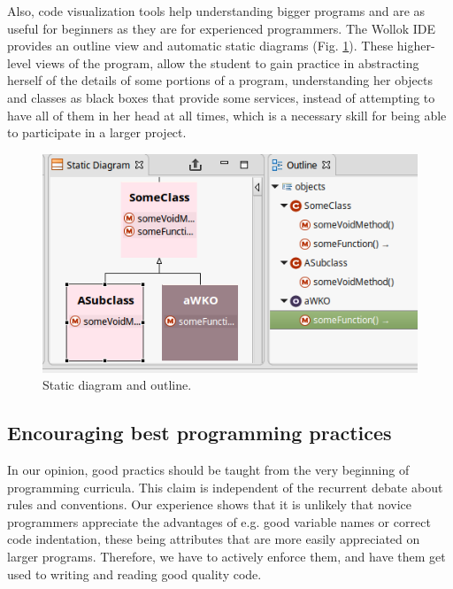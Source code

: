 Also, code visualization tools help understanding bigger programs and are as useful for beginners as they are for experienced programmers.
The Wollok IDE provides an outline view and automatic static diagrams (\cf Fig. \ref{fig:outline}).
These higher-level views of the program, allow the student to gain practice in abstracting herself of the details of some portions of a program, understanding her objects and classes as black boxes that provide some services, instead of attempting to have all of them in her head at all times, which is a necessary skill for being able to participate in a larger project.

\begin{figure}[ht]
 \centering
 \includegraphics[scale=0.5]{images/outline.png}
 \caption{\small Static diagram and outline.}
 \label{fig:outline}
\end{figure}


\subsection{Encouraging best programming practices}
In our opinion, good practics should be taught from the very beginning of programming curricula. This claim is independent of the recurrent debate about rules and conventions. 
Our experience shows that it is unlikely that novice programmers appreciate the advantages of e.g. good variable names or correct code indentation, these being attributes that are more easily appreciated on larger programs.
Therefore, we have to actively enforce them, and have them get used to writing and reading good quality code.


